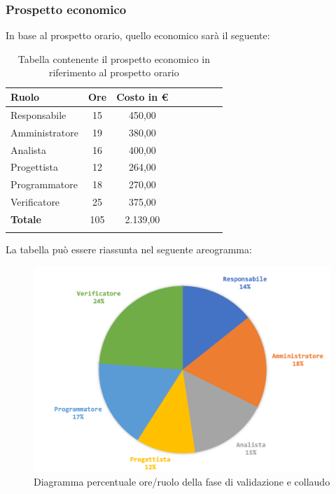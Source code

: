 		\subsubsection{Prospetto economico}
		In base al prospetto orario, quello economico sarà il seguente: 
		
		\begin{longtable}{|l|c|c|c|c|c|c|c|}
			\hline
			\rowcolor{lighter-grayer}
			\textbf{Ruolo} & \textbf{Ore} & \textbf{Costo in € } \\
			\hline
			\endfirsthead
			
			\hline
			Responsabile 	    & 15 & 450,00\\
			\hline 
			\hline
			Amministratore	   & 19 & 380,00\\
			\hline
			\hline
			Analista 				& 16 & 400,00\\
			\hline
			\hline
			Progettista 		   & 12 & 264,00\\
			\hline
			\hline
			Programmatore 	  & 18 & 270,00\\
			\hline
			\hline
			Verificatore 		   & 25 & 375,00\\
			\hline
			\textbf{Totale} 	 & 105 & 2.139,00\\
			\hline
			\caption{Tabella contenente il prospetto economico in riferimento al prospetto orario}
		\end{longtable}
		
		La tabella può essere riassunta nel seguente areogramma:
		\begin{figure}[H]
			\centering
			\includegraphics[width=0.8\linewidth]{./images/preventivo/validColl2.png}
			\caption{Diagramma percentuale ore/ruolo della fase di validazione e collaudo}
			\label{fig:diagramma costi ruolo fase di validazione e collaudo}
		\end{figure}	
	\pagebreak	
		

